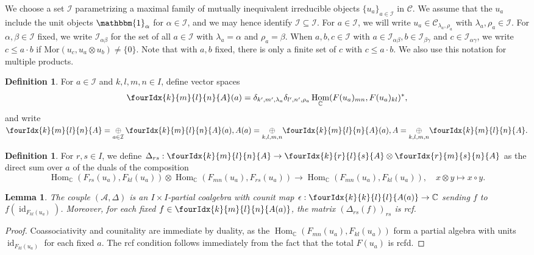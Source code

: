 \documentclass[10pt]{article}
\DeclareMathOperator{\id}{id}
\DeclareMathOperator{\Hom}{Hom}
\newcommand{\C}{\mathbb{C}}
\newcommand{\CatC}{\mathcal{C}}
\newcommand{\Mor}{\mathrm{Mor}}
\newcommand{\Unitb}{\mathbbm{1}}
\newcommand{\Gr}[5]{\fourIdx{#2}{#4}{#3}{#5}{#1}}%
\newtheorem{Lem}[Theorem]{Lemma}
\theoremstyle{definition}
\newtheorem{Def}[Theorem]{Definition}
\numberwithin{equation}{section}
\begin{document}
We choose a set $\mathcal{I}$ parametrizing a maximal family of mutually inequivalent irreducible objects $\{u_a\}_{a\in \mathcal{I}}$ in $\CatC$. We assume that the $u_a$ include the unit objects $\Unitb_{\alpha}$ for $\alpha\in \mathscr{I}$, and we may hence identify $\mathscr{I}\subseteq \mathcal{I}$. For $a\in \mathcal{I}$, we will write $u_a \in \CatC_{\lambda_a,\rho_a}$ with $\lambda_a,\rho_a\in \mathscr{I}$. For $\alpha,\beta\in \mathscr{I}$ fixed, we write $\mathcal{I}_{\alpha\beta}$ for the set of all $a\in \mathcal{I}$ with $\lambda_a=\alpha$ and $\rho_a=\beta$. When $a,b,c\in \mathcal{I}$ with $a\in \mathcal{I}_{\alpha\beta},b\in \mathcal{I}_{\beta\gamma}$ and $c\in \mathcal{I}_{\alpha\gamma}$, we write $c\leq a\cdot b$ if $\Mor(u_c,u_a\otimes u_b)\neq \{0\}$. Note that with $a,b$ fixed, there is only a finite set of $c$ with $c\leq a\cdot b$. We also use this notation for multiple products.

\begin{Def} For $a\in \mathcal{I}$ and $k,l,m,n\in I$, define vector spaces \[\Gr{A}{k}{l}{m}{n}(a) =  \delta_{k',m',\lambda_a}\delta_{l',n',\rho_a} \Hom_{\C}(F(u_a)_{mn},F(u_a)_{kl})^*,\] and write $\Gr{A}{k}{l}{m}{n} =\underset{a\in \mathcal{I}}{\oplus}\, \Gr{A}{k}{l}{m}{n}(a), A(a) = \underset{k,l,m,n}{\oplus} \Gr{A}{k}{l}{m}{n}(a), A = \underset{k,l,m,n}{\oplus} \Gr{A}{k}{l}{m}{n}.$
\end{Def} 


\begin{Def} For $r,s\in I$, we define $\Delta_{rs}: \Gr{A}{k}{l}{m}{n}\rightarrow \Gr{A}{k}{l}{r}{s}\otimes \Gr{A}{r}{s}{m}{n}$ as the direct sum over $a$ of the duals of the composition \[\Hom_{\C}(F_{rs}(u_a),F_{kl}(u_a)) \otimes \Hom_{\C}(F_{mn}(u_a),F_{rs}(u_a))\rightarrow \Hom_{\C}(F_{mn}(u_a),F_{kl}(u_a)),\quad x\otimes y \mapsto x\circ y.\]
\end{Def} 

\begin{Lem} The couple $(\mathscr{A},\Delta)$ is an $I\times I$-partial coalgebra with counit map $\epsilon:\Gr{A(a)}{k}{l}{k}{l}\rightarrow \C$ sending $f$ to $f(\id_{F_{kl}(u_a)})$. Moreover, for each fixed $f\in \Gr{A(a)}{k}{l}{m}{n}$, the matrix $\left(\Delta_{rs}(f)\right)_{rs}$ is rcf.
\end{Lem} 
\begin{proof} Coassociativity and counitality are immediate by duality, as the $\Hom_{\C}(F_{mn}(u_a),F_{kl}(u_a))$ form a partial algebra with units $\id_{F_{kl}(u_a)}$ for each fixed $a$. The rcf condition follows immediately from the fact that the total $F(u_a)$ is rcfd.
\end{proof}
\end{document}
